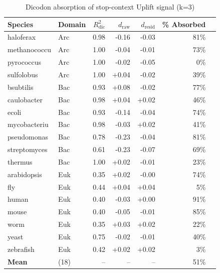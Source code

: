 
\begin{table}[htbp]
\centering
\caption{Dicodon absorption of stop-context Uplift signal (k=3)}
\label{tab:dicodon_absorption}
\begin{tabular}{llrrrrr}
\toprule
Species & Domain & $R^2_{\mathrm{dic}}$ & $d_{\mathrm{raw}}$ & $d_{\mathrm{resid}}$ & \% Absorbed \\
\midrule
haloferax & Arc & 0.98 & -0.16 & -0.03 & 81\% \\
methanococcu & Arc & 1.00 & -0.04 & -0.01 & 73\% \\
pyrococcus & Arc & 1.00 & -0.02 & -0.05 & 0\% \\
sulfolobus & Arc & 1.00 & +0.04 & -0.02 & 39\% \\
bsubtilis & Bac & 0.93 & +0.08 & -0.02 & 77\% \\
caulobacter & Bac & 0.98 & +0.04 & +0.02 & 46\% \\
ecoli & Bac & 0.93 & -0.14 & -0.04 & 74\% \\
mycobacteriu & Bac & 0.98 & -0.03 & +0.02 & 41\% \\
pseudomonas & Bac & 0.78 & -0.23 & -0.04 & 81\% \\
streptomyces & Bac & 0.61 & -0.23 & -0.07 & 69\% \\
thermus & Bac & 1.00 & +0.02 & -0.01 & 23\% \\
arabidopsis & Euk & 0.35 & +0.02 & -0.00 & 74\% \\
fly & Euk & 0.44 & +0.04 & +0.04 & 5\% \\
human & Euk & 0.40 & -0.03 & +0.00 & 91\% \\
mouse & Euk & 0.40 & -0.05 & -0.01 & 85\% \\
worm & Euk & 0.35 & +0.03 & +0.02 & 22\% \\
yeast & Euk & 0.75 & -0.02 & -0.01 & 40\% \\
zebrafish & Euk & 0.42 & +0.02 & +0.02 & 3\% \\
\midrule
\textbf{Mean} & (18) & -- & -- & -- & 51\% \\
\bottomrule
\end{tabular}
\end{table}